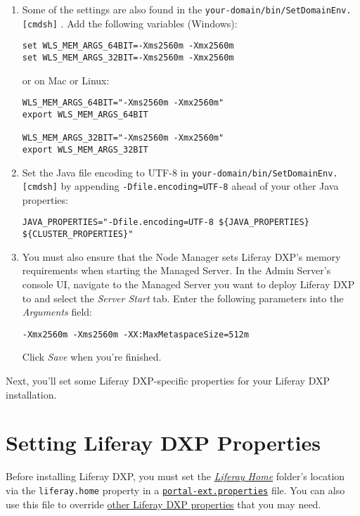 \begin{enumerate}
\def\labelenumi{\arabic{enumi}.}
\setcounter{enumi}{2}
\item
  Some of the settings are also found in the
  \texttt{your-domain/bin/SetDomainEnv.{[}cmd\textbar{}sh{]}} . Add the
  following variables (Windows):

\begin{verbatim}
set WLS_MEM_ARGS_64BIT=-Xms2560m -Xmx2560m
set WLS_MEM_ARGS_32BIT=-Xms2560m -Xmx2560m
\end{verbatim}

  or on Mac or Linux:

\begin{verbatim}
WLS_MEM_ARGS_64BIT="-Xms2560m -Xmx2560m"
export WLS_MEM_ARGS_64BIT

WLS_MEM_ARGS_32BIT="-Xms2560m -Xmx2560m"
export WLS_MEM_ARGS_32BIT
\end{verbatim}
\item
  Set the Java file encoding to UTF-8 in
  \texttt{your-domain/bin/SetDomainEnv.{[}cmd\textbar{}sh{]}} by
  appending \texttt{-Dfile.encoding=UTF-8} ahead of your other Java
  properties:

\begin{verbatim}
JAVA_PROPERTIES="-Dfile.encoding=UTF-8 ${JAVA_PROPERTIES} ${CLUSTER_PROPERTIES}"
\end{verbatim}
\item
  You must also ensure that the Node Manager sets Liferay DXP's memory
  requirements when starting the Managed Server. In the Admin Server's
  console UI, navigate to the Managed Server you want to deploy Liferay
  DXP to and select the \emph{Server Start} tab. Enter the following
  parameters into the \emph{Arguments} field:

\begin{verbatim}
-Xmx2560m -Xms2560m -XX:MaxMetaspaceSize=512m
\end{verbatim}

  Click \emph{Save} when you're finished.
\end{enumerate}

Next, you'll set some Liferay DXP-specific properties for your Liferay
DXP installation.

\section{Setting Liferay DXP
Properties}\label{setting-liferay-dxp-properties}

Before installing Liferay DXP, you must set the
\href{/docs/7-2/deploy/-/knowledge_base/d/liferay-home}{\emph{Liferay
Home}} folder's location via the \texttt{liferay.home} property in a
\href{/docs/7-2/deploy/-/knowledge_base/d/portal-properties}{\texttt{portal-ext.properties}}
file. You can also use this file to override
\href{https://docs.liferay.com/dxp/portal/7.2-latest/propertiesdoc/portal.properties.html}{other
Liferay DXP properties} that you may need.

